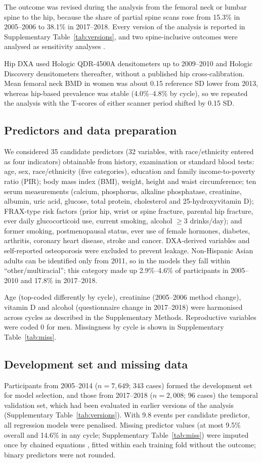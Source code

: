 \documentclass[11pt,a4paper]{article}
\begin{document}
The outcome was revised during the analysis from the femoral neck or lumbar spine to the hip, because the share of partial spine scans rose from 15.3\% in 2005--2006 to 38.1\% in 2017--2018. Every version of the analysis is reported in Supplementary Table~\ref{tab:versions}, and two spine-inclusive outcomes were analysed as sensitivity analyses \cite{baim2008,wright2014}.

Hip DXA used Hologic QDR-4500A densitometers up to 2009--2010 and Hologic Discovery densitometers thereafter, without a published hip cross-calibration. Mean femoral neck BMD in women was about 0.15 reference SD lower from 2013, whereas hip-based prevalence was stable (4.0\%--4.8\% by cycle), so we repeated the analysis with the T-scores of either scanner period shifted by 0.15 SD.

\subsection{Predictors and data preparation}
We considered 35 candidate predictors (32 variables, with race/ethnicity entered as four indicators) obtainable from history, examination or standard blood tests: age, sex, race/ethnicity (five categories), education and family income-to-poverty ratio (PIR); body mass index (BMI), weight, height and waist circumference; ten serum measurements (calcium, phosphorus, alkaline phosphatase, creatinine, albumin, uric acid, glucose, total protein, cholesterol and 25-hydroxyvitamin D); FRAX-type risk factors (prior hip, wrist or spine fracture, parental hip fracture, ever daily glucocorticoid use, current smoking, alcohol $\ge$3 drinks/day); and former smoking, postmenopausal status, ever use of female hormones, diabetes, arthritis, coronary heart disease, stroke and cancer. DXA-derived variables and self-reported osteoporosis were excluded to prevent leakage. Non-Hispanic Asian adults can be identified only from 2011, so in the models they fall within ``other/multiracial''; this category made up 2.9\%--4.6\% of participants in 2005--2010 and 17.8\% in 2017--2018.

Age (top-coded differently by cycle), creatinine (2005--2006 method change), vitamin D and alcohol (questionnaire change in 2017--2018) were harmonised across cycles as described in the Supplementary Methods. Reproductive variables were coded 0 for men. Missingness by cycle is shown in Supplementary Table~\ref{tab:miss}.

\subsection{Development set and missing data}
Participants from 2005--2014 ($n=7{,}649$; 343 cases) formed the development set for model selection, and those from 2017--2018 ($n=2{,}008$; 96 cases) the temporal validation set, which had been evaluated in earlier versions of the analysis (Supplementary Table~\ref{tab:versions}). With 9.8 events per candidate predictor, all regression models were penalised. Missing predictor values (at most 9.5\% overall and 14.6\% in any cycle; Supplementary Table~\ref{tab:miss}) were imputed once by chained equations \cite{vanbuuren2011}, fitted within each training fold without the outcome; binary predictors were not rounded.
\end{document}
